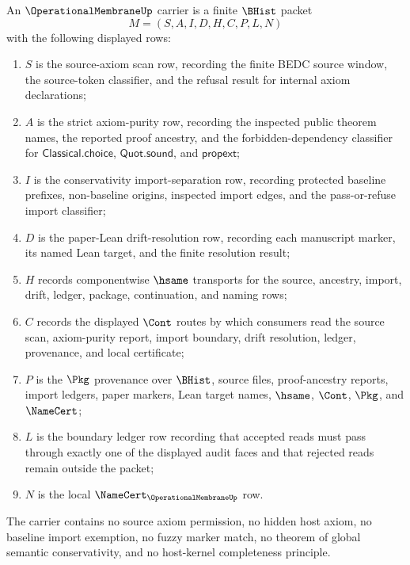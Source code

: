 \begin{definition}
\label{def:operational-membrane-carrier}
An $\OperationalMembraneUp$ carrier is a finite $\BHist$ packet
$$
M=(S,A,I,D,H,C,P,L,N)
$$
with the following displayed rows:
\begin{enumerate}
\item $S$ is the source-axiom scan row, recording the finite BEDC source window, the source-token classifier, and the refusal result for internal axiom declarations;
\item $A$ is the strict axiom-purity row, recording the inspected public theorem names, the reported proof ancestry, and the forbidden-dependency classifier for $\mathsf{Classical.choice}$, $\mathsf{Quot.sound}$, and $\mathsf{propext}$;
\item $I$ is the conservativity import-separation row, recording protected baseline prefixes, non-baseline origins, inspected import edges, and the pass-or-refuse import classifier;
\item $D$ is the paper-Lean drift-resolution row, recording each manuscript marker, its named Lean target, and the finite resolution result;
\item $H$ records componentwise $\hsame$ transports for the source, ancestry, import, drift, ledger, package, continuation, and naming rows;
\item $C$ records the displayed $\Cont$ routes by which consumers read the source scan, axiom-purity report, import boundary, drift resolution, ledger, provenance, and local certificate;
\item $P$ is the $\Pkg$ provenance over $\BHist$, source files, proof-ancestry reports, import ledgers, paper markers, Lean target names, $\hsame$, $\Cont$, $\Pkg$, and $\NameCert$;
\item $L$ is the boundary ledger row recording that accepted reads must pass through exactly one of the displayed audit faces and that rejected reads remain outside the packet;
\item $N$ is the local $\NameCert_{\OperationalMembraneUp}$ row.
\end{enumerate}
The carrier contains no source axiom permission, no hidden host axiom, no baseline import exemption, no fuzzy marker match, no theorem of global semantic conservativity, and no host-kernel completeness principle.
\end{definition}

